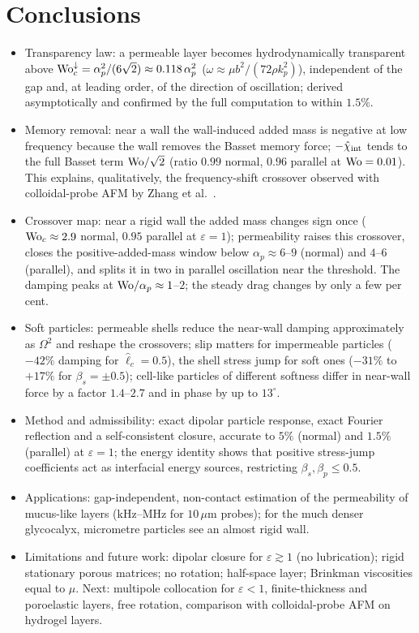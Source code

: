 \section{Conclusions}\label{sec:conclusion}
\begin{itemize}
  \item Transparency law: a permeable layer becomes hydrodynamically transparent above
        $\mathrm{Wo}_c^{\downarrow}=\alpha_p^2/(6\sqrt2)\approx0.118\,\alpha_p^2$ ($\omega\approx\mu b^2/(72\rho k_p^2)$), independent
        of the gap and, at leading order, of the direction of oscillation; derived asymptotically and confirmed by the
        full computation to within $1.5\%$.
  \item Memory removal: near a wall the wall-induced added mass is negative at low frequency because the wall
        removes the Basset memory force; $-\hat\chi_{\rm int}$ tends to the full Basset term $\mathrm{Wo}/\sqrt2$ (ratio $0.99$ normal,
        $0.96$ parallel at $\mathrm{Wo}=0.01$). This explains, qualitatively, the frequency-shift crossover observed with
        colloidal-probe AFM by Zhang et al.~\cite{zhang2023unsteady}.
  \item Crossover map: near a rigid wall the added mass changes sign once ($\mathrm{Wo}_c\approx2.9$ normal, $0.95$
        parallel at $\varepsilon=1$); permeability raises this crossover, closes the positive-added-mass window below
        $\alpha_p\approx6$--$9$ (normal) and $4$--$6$ (parallel), and splits it in two in parallel oscillation near the
        threshold. The damping peaks at $\mathrm{Wo}/\alpha_p\approx1$--$2$; the steady drag changes by only a few per cent.
  \item Soft particles: permeable shells reduce the near-wall damping approximately as $\Omega^2$ and reshape the
        crossovers; slip matters for impermeable particles ($-42\%$ damping for $\hat\ell_c=0.5$), the shell stress jump
        for soft ones ($-31\%$ to $+17\%$ for $\beta_s=\pm0.5$); cell-like particles of different softness differ in
        near-wall force by a factor $1.4$--$2.7$ and in phase by up to $13^\circ$.
  \item Method and admissibility: exact dipolar particle response, exact Fourier reflection and a
        self-consistent closure, accurate to $5\%$ (normal) and $1.5\%$ (parallel) at $\varepsilon=1$; the energy identity
        shows that positive stress-jump coefficients act as interfacial energy sources, restricting $\beta_s,\beta_p\le0.5$.
  \item Applications: gap-independent, non-contact estimation of the permeability of mucus-like layers
        (kHz--MHz for $10\,\mu$m probes); for the much denser glycocalyx, micrometre particles see an almost rigid wall.
  \item Limitations and future work: dipolar closure for $\varepsilon\gtrsim1$ (no lubrication); rigid
        stationary porous matrices; no rotation; half-space layer; Brinkman viscosities equal to $\mu$. Next: multipole
        collocation for $\varepsilon<1$, finite-thickness and poroelastic layers, free rotation, comparison with
        colloidal-probe AFM on hydrogel layers.
\end{itemize}
